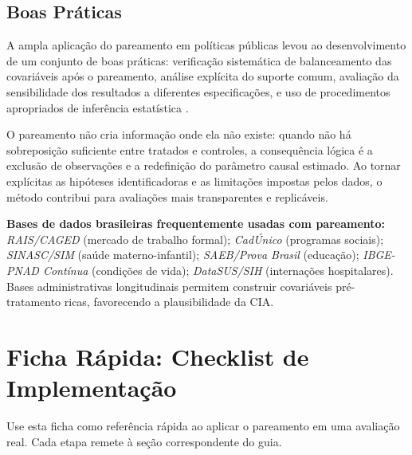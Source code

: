 \documentclass[12pt,a4paper]{article}
\begin{document}
\subsection*{Boas Práticas}

A ampla aplicação do pareamento em políticas públicas levou ao desenvolvimento de um conjunto de boas práticas: verificação sistemática de balanceamento das covariáveis após o pareamento, análise explícita do suporte comum, avaliação da sensibilidade dos resultados a diferentes especificações, e uso de procedimentos apropriados de inferência estatística \citep{abadie2006large}.

O pareamento não cria informação onde ela não existe: quando não há sobreposição suficiente entre tratados e controles, a consequência lógica é a exclusão de observações e a redefinição do parâmetro causal estimado. Ao tornar explícitas as hipóteses identificadoras e as limitações impostas pelos dados, o método contribui para avaliações mais transparentes e replicáveis.

\begin{tcolorbox}[colback=orangebg, colframe=orangeframe, boxrule=0.5pt, arc=2pt,
  left=6pt, right=6pt, top=4pt, bottom=4pt]
\textcolor{orangeframe}{\textbf{Bases de dados brasileiras frequentemente usadas com pareamento:}}
\textit{RAIS/CAGED} (mercado de trabalho formal); \textit{CadÚnico} (programas sociais); \textit{SINASC/SIM} (saúde materno-infantil); \textit{SAEB/Prova Brasil} (educação); \textit{IBGE-PNAD Contínua} (condições de vida); \textit{DataSUS/SIH} (internações hospitalares). Bases administrativas longitudinais permitem construir covariáveis pré-tratamento ricas, favorecendo a plausibilidade da CIA.
\end{tcolorbox}

\newpage
\section*{Ficha Rápida: Checklist de Implementação}

\noindent Use esta ficha como referência rápida ao aplicar o pareamento em uma avaliação real. Cada etapa remete à seção correspondente do guia.

\vspace{0.4cm}
\end{document}
